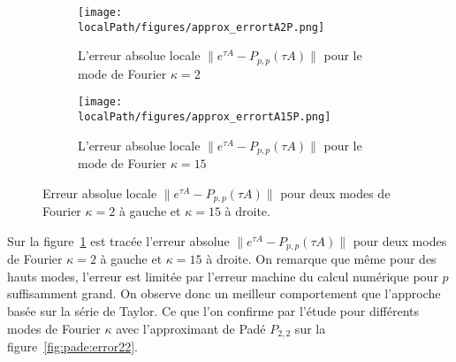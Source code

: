 
\begin{figure}
  \begin{subfigure}{.5\textwidth}
    \centering
    \texttt{[image: \\localPath/figures/approx\_errortA2P.png]}
    \caption{L'erreur absolue locale $\|e^{\tau A}-P_{p,p}(\tau A)\|$ pour le mode de Fourier $\kappa=2$}
  \end{subfigure}
  \begin{subfigure}{.5\textwidth}
    \centering
    \texttt{[image: \\localPath/figures/approx\_errortA15P.png]}
    \caption{L'erreur absolue locale $\|e^{\tau A}-P_{p,p}(\tau A)\|$ pour le mode de Fourier $\kappa=15$}
  \end{subfigure}
  \caption{Erreur absolue locale $\|e^{\tau A}-P_{p,p}(\tau A)\|$ pour deux modes de Fourier $\kappa=2$ à gauche et $\kappa=15$ à droite.}
  \label{fig:pade:error}
\end{figure}

Sur la figure~\ref{fig:pade:error} est tracée l'erreur absolue $\|e^{\tau A}-P_{p,p}(\tau A)\|$ pour deux modes de Fourier $\kappa=2$ à gauche et $\kappa=15$ à droite. On remarque que même pour des hauts modes, l'erreur est limitée par l'erreur machine du calcul numérique pour $p$ suffisamment grand. On observe donc un meilleur comportement que l'approche basée sur la série de Taylor. Ce que l'on confirme par l'étude pour différents modes de Fourier $\kappa$ avec l'approximant de Padé $P_{2,2}$ sur la figure~\ref{fig:pade:error22}.

